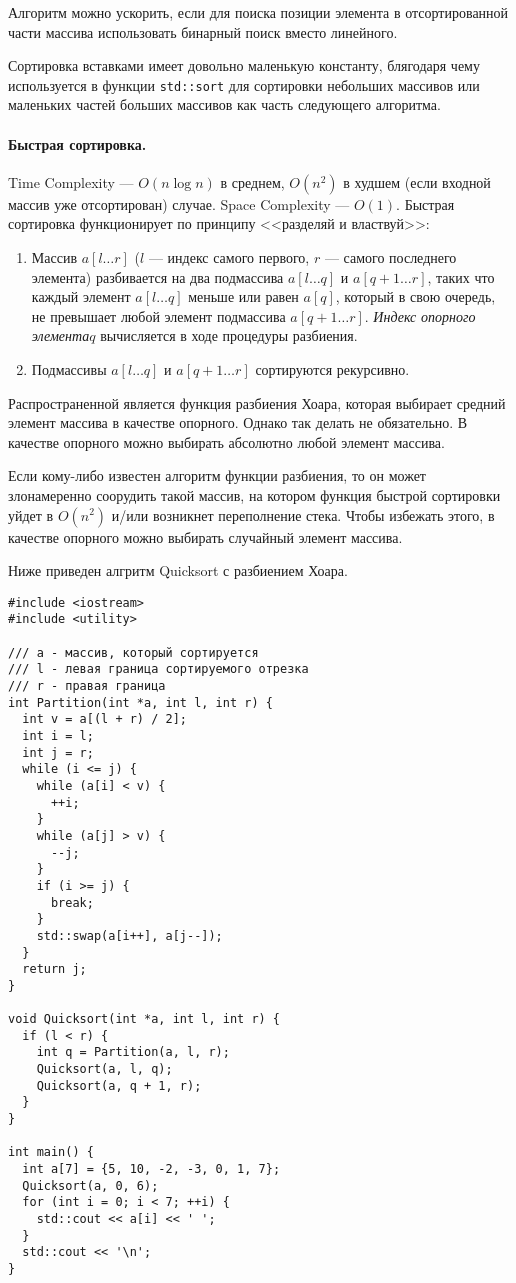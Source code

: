 \documentclass[14pt, a4paper]{extarticle}
\begin{document}
{\small
Алгоритм можно ускорить, если для поиска позиции элемента в отсортированной части массива
использовать бинарный поиск вместо линейного.

Сортировка вставками имеет довольно маленькую константу, блягодаря чему используется в функции \verb|std::sort|
для сортировки небольших массивов или маленьких частей больших массивов как часть следующего алгоритма. }

\paragraph{Быстрая сортировка.} Time Complexity --- $O(n\log n)$ в среднем, $O(n^2)$
в худшем (если входной массив уже отсортирован) случае. Space Complexity --- $O(1)$.
Быстрая сортировка функционирует по принципу <<разделяй и властвуй>>:
\begin{enumerate}
  \item Массив $a[l\dots r]$ ($l$ --- индекс самого первого, $r$ --- самого последнего элемента)
  разбивается на два подмассива $a[l\dots q]$ и $a[q+1\dots r]$, таких что каждый элемент $a[l\dots q]$
  меньше или равен $a[q]$, который в свою очередь, не превышает любой элемент подмассива $a[q+1\dots r]$.
  \textit{Индекс опорного элемента}$q$ вычисляется в ходе процедуры разбиения.
  \item Подмассивы $a[l\dots q]$ и $a[q+1\dots r]$ сортируются рекурсивно.
\end{enumerate}

Распространенной является функция разбиения Хоара, которая выбирает средний элемент массива
в качестве опорного. Однако так делать не обязательно. В качестве опорного можно выбирать
абсолютно любой элемент массива.

Если кому-либо известен алгоритм функции разбиения, то он может злонамеренно соорудить
такой массив, на котором функция быстрой сортировки уйдет в $O(n^2)$ и/или возникнет
переполнение стека. Чтобы избежать этого, в качестве опорного можно выбирать случайный
элемент массива.

Ниже приведен алгритм Quicksort с разбиением Хоара.
\begin{verbatim}
#include <iostream>
#include <utility>

/// a - массив, который сортируется
/// l - левая граница сортируемого отрезка
/// r - правая граница
int Partition(int *a, int l, int r) {
  int v = a[(l + r) / 2];
  int i = l;
  int j = r;
  while (i <= j) {
    while (a[i] < v) {
      ++i;
    }
    while (a[j] > v) {
      --j;
    }
    if (i >= j) {
      break;
    }
    std::swap(a[i++], a[j--]);
  }
  return j;
}

void Quicksort(int *a, int l, int r) {
  if (l < r) {
    int q = Partition(a, l, r);
    Quicksort(a, l, q);
    Quicksort(a, q + 1, r);
  }
}

int main() {
  int a[7] = {5, 10, -2, -3, 0, 1, 7};
  Quicksort(a, 0, 6);
  for (int i = 0; i < 7; ++i) {
    std::cout << a[i] << ' ';
  }
  std::cout << '\n';
}
\end{verbatim}
\end{document}
